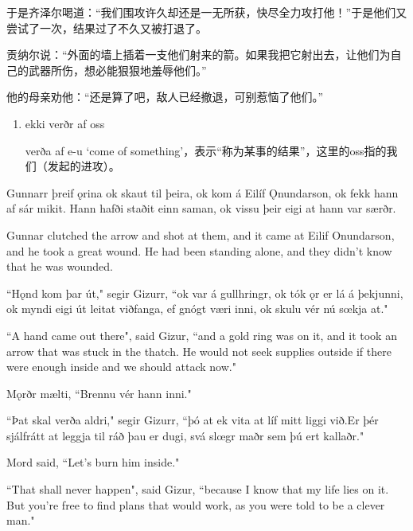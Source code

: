 \begin{translation*}{}
    于是齐泽尔喝道：“我们围攻许久却还是一无所获，快尽全力攻打他！”于是他们又尝试了一次，结果过了不久又被打退了。

    贡纳尔说：“外面的墙上插着一支他们射来的箭。如果我把它射出去，让他们为自己的武器所伤，想必能狠狠地羞辱他们。”

    他的母亲劝他：“还是算了吧，敌人已经撤退，可别惹恼了他们。”
\end{translation*}
\begin{grammar*}{}
    \begin{enumerate}[leftmargin=*]
        \item ekki verðr af oss

              verða af e-u `come of something'，表示“称为某事的结果”，这里的oss指的我们（发起的进攻）。
    \end{enumerate}
\end{grammar*}
\begin{paracol}{2}
    Gunnarr þreif ǫrina ok skaut til þeira, ok kom á Eilíf Ǫnundarson, ok fekk hann af sár mikit. Hann hafði staðit einn saman, ok vissu þeir eigi at hann var særðr.

    \switchcolumn
    Gunnar clutched the arrow and shot at them, and it came at Eilif Onundarson, and he took a great wound. He had been standing alone, and they didn't know that he was wounded.

    \switchcolumn*

    ``Hǫnd kom þar út," segir Gizurr, ``ok var á gullhringr, ok tók ǫr er lá á þekjunni, ok myndi eigi út leitat viðfanga, ef gnógt væri inni, ok skulu vér nú sœkja at."

    \switchcolumn

    ``A hand came out there", said Gizur, ``and a gold ring was on it, and it took an arrow that was stuck in the thatch. He would not seek supplies outside if there were enough inside and we should attack now."

    \switchcolumn*

    Mǫrðr mælti, ``Brennu vér hann inni."

    ``Þat skal verða aldri," segir Gizurr, ``þó at ek vita at líf mitt liggi við.\footnotemark[1] Er þér sjálfrátt at leggja til ráð þau er dugi, svá slœgr maðr sem þú ert kallaðr."


    \switchcolumn

    Mord said, ``Let's burn him inside."

    ``That shall never happen", said Gizur, ``because I know that my life lies on it. But you're free to find plans that would work, as you were told to be a clever man."
\end{paracol}
